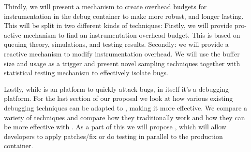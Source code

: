 Thirdly, we will present a mechanism to create overhead budgets for instrumentation in the debug container to make \livedebugging more robust, and longer lasting.
This will be split in two different kinds of techniques: Firstly, we will provide pro-active mechanism to find an instrumentation overhead budget. This is based on queuing theory, simulations, and testing results. 
Secondly: we will provide a reactive mechanism to modify instrumentation overhead. 
We will use the buffer size and usage as a trigger and present novel sampling techniques together with statistical testing mechanism to effectively isolate bugs.

Lastly, while \parikshan is an platform to quickly attack bugs, in itself it's a debugging platform. For the last section of our proposal we look at how various existing debugging techniques can be adapted to \livedebugging, making it more effective. We compare a variety of techniques and compare how they traditionally work and how they can be more effective with \parikshan. As a part of this we will propose \activedebugging, which will allow developers to apply patches/fix or do testing in parallel to the production container.

